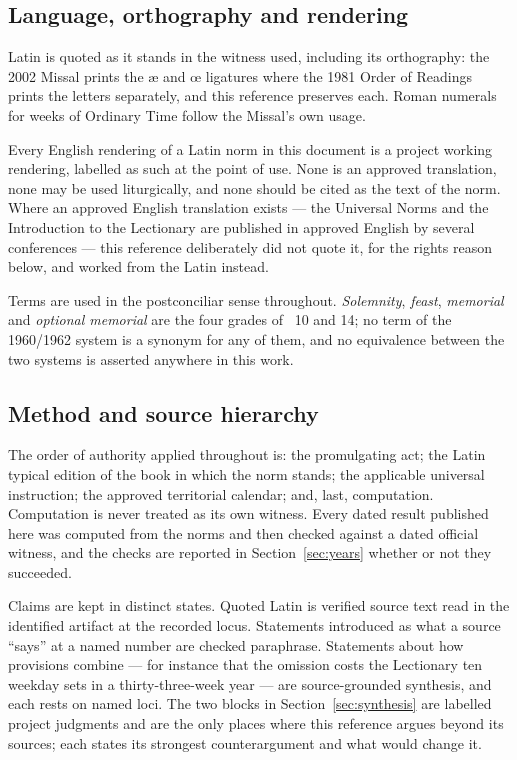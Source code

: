 \subsection{Language, orthography and rendering}

Latin is quoted as it stands in the witness used, including its orthography: the 2002 Missal prints
the \ae{} and \oe{} ligatures where the 1981 Order of Readings prints the letters separately, and
this reference preserves each. Roman numerals for weeks of Ordinary Time follow the Missal's own
usage.

Every English rendering of a Latin norm in this document is a project working rendering, labelled as
such at the point of use. None is an approved translation, none may be used liturgically, and none
should be cited as the text of the norm. Where an approved English translation exists --- the
Universal Norms and the Introduction to the Lectionary are published in approved English by several
conferences --- this reference deliberately did not quote it, for the rights reason below, and worked
from the Latin instead.

Terms are used in the postconciliar sense throughout. \emph{Solemnity}, \emph{feast},
\emph{memorial} and \emph{optional memorial} are the four grades of ~10 and 14; no term of
the 1960/1962 system is a synonym for any of them, and no equivalence between the two systems is
asserted anywhere in this work.

\subsection{Method and source hierarchy}

The order of authority applied throughout is: the promulgating act; the Latin typical edition of the
book in which the norm stands; the applicable universal instruction; the approved territorial
calendar; and, last, computation. Computation is never treated as its own witness. Every dated
result published here was computed from the norms and then checked against a dated official witness,
and the checks are reported in Section~\ref{sec:years} whether or not they succeeded.

Claims are kept in distinct states. Quoted Latin is verified source text read in the identified
artifact at the recorded locus. Statements introduced as what a source ``says'' at a named number are
checked paraphrase. Statements about how provisions combine --- for instance that the omission costs
the Lectionary ten weekday sets in a thirty-three-week year --- are source-grounded synthesis, and
each rests on named loci. The two blocks in Section~\ref{sec:synthesis} are labelled project
judgments and are the only places where this reference argues beyond its sources; each states its
strongest counterargument and what would change it.

